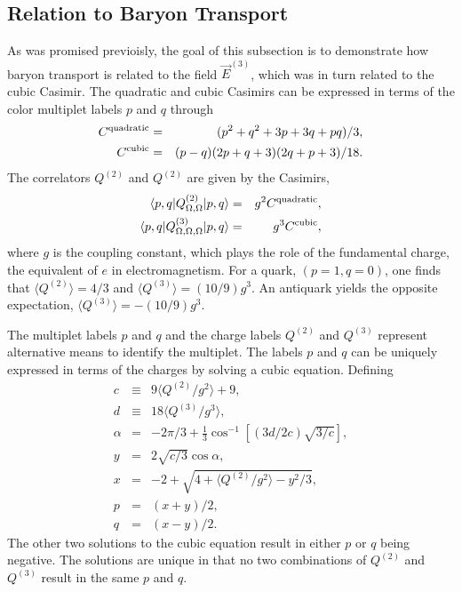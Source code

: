 \documentclass[aps, prc, 12pt, nofootinbib, showpacs, superscriptaddress, tightenlines, groupedaddress]{revtex4-2}
\begin{document}
\subsection{Relation to Baryon Transport}

As was promised previoisly, the goal of this subsection is to demonstrate how baryon transport is related to the field $\vec{E}^{(3)}$, which was in turn related to the cubic Casimir. The quadratic and cubic Casimirs can be expressed in terms of the color multiplet labels $p$ and $q$ through
\begin{eqnarray}\label{eq:Q2Q3vspq}
C^{\rm quadratic}&=&(p^2+q^2+3p+3q+pq)/3,\\
\nonumber
C^{\rm cubic}&=&(p-q)(2p+q+3)(2q+p+3)/18.
\end{eqnarray}
The correlators $Q^{(2)}$ and $Q^{(2)}$ are given by the Casimirs,
\begin{eqnarray}
\langle p,q|Q^{(2)}_{\Omega,\Omega}|p,q\rangle&=&g^2C^{\rm quadratic},\\
\nonumber
\langle p,q|Q^{(3)}_{\Omega,\Omega,\Omega}|p,q\rangle&=&g^3C^{\rm cubic},
\end{eqnarray}
where $g$ is the coupling constant, which plays the role of the fundamental charge, the equivalent of $e$ in electromagnetism. For a quark, $(p=1,q=0)$, one finds that $\langle Q^{(2)}\rangle=4/3$ and $\langle Q^{(3)}\rangle=(10/9)g^3$. An antiquark yields the opposite expectation,  $\langle Q^{(3)}\rangle=-(10/9)g^3$.

The multiplet labels $p$ and $q$ and the charge labels $Q^{(2)}$ and $Q^{(3)}$ represent alternative means to identify the multiplet. The labels $p$ and $q$ can be uniquely expressed in terms of the charges by solving a cubic equation. Defining
\begin{eqnarray}
c&\equiv&9\langle Q^{(2)}/g^2\rangle+9,\\
\nonumber
d&\equiv&18\langle Q^{(3)}/g^3\rangle,\\
\nonumber
\alpha&=&-2\pi /3+\frac{1}{3}\cos^{-1}[(3d/2c)\sqrt{3/c}],\\
\nonumber
y&=&2\sqrt{c/3}\cos\alpha,\\
\nonumber
x&=&-2+\sqrt{4+\langle Q^{(2)}/g^2\rangle-y^2/3},\\
\nonumber
p&=&(x+y)/2,\\
\nonumber
q&=&(x-y)/2.
\end{eqnarray}
The other two solutions to the cubic equation result in either $p$ or $q$ being negative. The solutions are unique in that no two combinations of  $Q^{(2)}$ and $Q^{(3)}$ result in the same $p$ and $q$.
\end{document}
